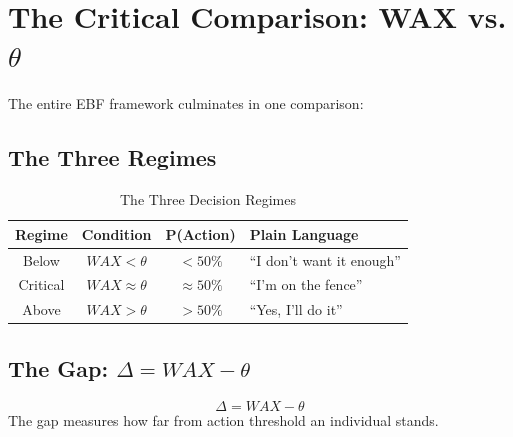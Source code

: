 \section{The Critical Comparison: WAX vs. $\theta$}
\label{sec:12-comparison}


The entire EBF framework culminates in one comparison:

\begin{center}
\end{center}

\subsection{The Three Regimes}

\begin{table}[h]
\centering
\caption{The Three Decision Regimes}
\label{tab:three-regimes}
\begin{tabular}{cccp{5cm}}
\toprule
\textbf{Regime} & \textbf{Condition} & \textbf{P(Action)} & \textbf{Plain Language}\\
\midrule
\cellcolor{red!15} Below & $WAX < \theta$ & $< 50\%$ & ``I don't want it enough''\\
\cellcolor{yellow!15} Critical & $WAX \approx \theta$ & $\approx 50\%$ & ``I'm on the fence''\\
\cellcolor{green!15} Above & $WAX > \theta$ & $> 50\%$ & ``Yes, I'll do it''\\
\bottomrule
\end{tabular}
\end{table}

\subsection{The Gap: $\Delta = WAX - \theta$}

\begin{definition}
\begin{equation}
\Delta = WAX - \theta
\label{eq:gap}
\end{equation}
The gap measures how far from action threshold an individual stands.
\end{definition}

